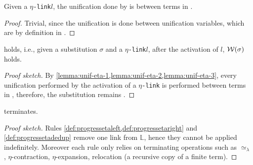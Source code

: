 \documentclass[sigconf,natbib=false,review]{acmart}
\newcommand{\UnifRel}{\ensuremath{\simeq}}
\newcommand{\Ue}{\ensuremath{\UnifRel_\lambda}\xspace}
\newcommand{\linkMacro}[1]{\ensuremath{#1}\texttt{-link}\xspace}
\newcommand{\linketa} {\linkMacro{\eta}}
\newcommand{\linkStore}{\ensuremath{\mathbb{L}}\xspace}
\begin{document}
\begin{lemma}
  Given a \linketa $l$, the unification done by \progressetadedup is between
  terms in \wellb.
  \label{lemma:unif-eta-3}
\end{lemma}

\begin{proof}
  Trivial, since the unification is done between unification variables, which
  are by definition in \wellb.
\end{proof}

\begin{lemma}
   holds, i.e., given a substitution $\sigma$ and a \linketa $l$,
  after the activation of $l$, $\mathcal{W}(\sigma)$ holds.
\end{lemma}

\begin{proof}[Proof sketch]
  By \cref{lemma:unif-eta-1,lemma:unif-eta-2,lemma:unif-eta-3}, every
  unification performed by the activation of a \linketa is performed between
  terms in \wellb, therefore, the substitution remains \wellb.
\end{proof}

\begin{lemma}
   terminates.
  \label{lemma:prog-eta-terminates}
\end{lemma}

\begin{proof}[Proof sketch]
  Rules \cref{def:progressetaleft,def:progressetaright} and
  \cref{def:progressetadedup} remove one link from \linkStore, hence they
  cannot be applied indefinitely.
  Moreover each rule only relies on terminating operations such as \Ue,
  $\eta$-contraction, $\eta$-expansion, relocation (a recursive copy of a
  finite term).
\end{proof}
\end{document}
